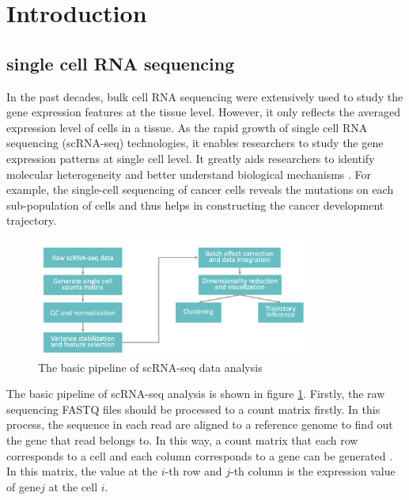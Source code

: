 \section{Introduction}

\subsection{single cell RNA sequencing}

In the past decades, bulk cell RNA sequencing were extensively used to study the gene expression features at the tissue level. However, it only reflects the averaged expression level of cells in a tissue. As the rapid growth of single cell RNA sequencing (scRNA-seq) technologies, it enables researchers to study the gene expression patterns at single cell level. It greatly aids researchers to identify molecular heterogeneity and better understand biological mechanisms \cite{shapiro2013single}. For example, the single-cell sequencing of cancer cells reveals the mutations on each sub-population of cells and thus helps in constructing the cancer development trajectory. 

\begin{figure}[htb!]
    \centering
    \includegraphics[width=0.8\textwidth]{figures/myfigures/scpip.png}
    \caption{The basic pipeline of scRNA-seq data analysis}
    \label{scpip}
\end{figure}

The basic pipeline of scRNA-seq analysis is shown in figure \ref{scpip}. Firstly, the raw sequencing FASTQ files should be processed to a count matrix firstly. In this process, the sequence in each read are aligned to a reference genome to find out the gene that read belongs to. In this way, a count matrix that each row corresponds to a cell and each column corresponds to a gene can be generated \cite{petukhov2017accurate}. In this matrix, the value at the $i$-th row and $j$-th column is the expression value of gene$j$ at the cell $i$.

